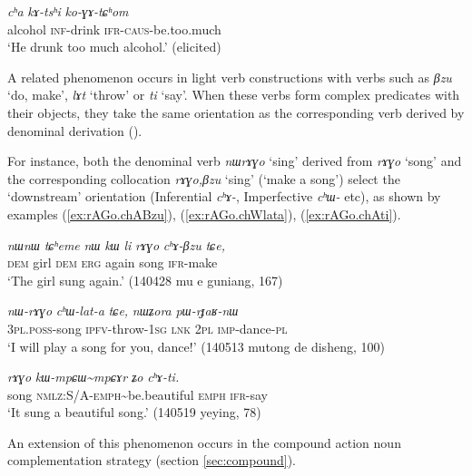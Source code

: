 \documentclass[oneside,a4paper,11pt]{article}
\newcommand{\ipa}[1]{\textit{\phon#1}}
\newcommand{\jpg}[2]{\ipa{#1} `#2'}
\newcommand{\tld}{\textasciitilde{}}
\newcommand{\refb}[1]{(\ref{#1})}
\begin{document}
\begin{exe}
\ex 
\gll \ipa{cʰa} 	\ipa{kɤ-tsʰi} 	\ipa{ko-ɣɤ-tɕʰom} \\
alcohol \textsc{inf}-drink \textsc{ifr-caus}-be.too.much \\
\glt `He drunk too much alcohol.' (elicited)
\end{exe}

A related phenomenon occurs in light verb constructions with verbs such as \jpg{βzu}{do, make}, \jpg{lɤt}{throw} or \jpg{ti}{say}. When these verbs form complex predicates with their objects, they take the same orientation as the corresponding verb derived by denominal derivation (\citealt[1220]{jacques12incorp}). 

For instance, both the denominal verb \jpg{nɯrɤɣo}{sing} derived from \jpg{rɤɣo}{song} and the corresponding collocation \jpg{rɤɣo,βzu}{sing} (`make a song') select the `downstream' orientation (Inferential \ipa{cʰɤ-}, Imperfective \ipa{cʰɯ-} etc), as shown by examples \refb{ex:rAGo.chABzu}, \refb{ex:rAGo.chWlata}, \refb{ex:rAGo.chAti}.

\begin{exe}
\ex \label{ex:rAGo.chABzu}
\gll \ipa{nɯnɯ} 	\ipa{tɕʰeme} 	\ipa{nɯ} 	\ipa{kɯ} 	\ipa{li} 	\ipa{rɤɣo} 	\ipa{cʰɤ-βzu} 	\ipa{tɕe,} \\
\textsc{dem} girl \textsc{dem} \textsc{erg} again song \textsc{ifr}-make \\
\glt `The girl sung again.' (140428 mu e guniang, 167)
\end{exe}

\begin{exe}
\ex \label{ex:rAGo.chWlata}
\gll 
\ipa{nɯ-rɤɣo} 	\ipa{cʰɯ-lat-a} 	\ipa{tɕe,} 	\ipa{nɯʑora} 	\ipa{pɯ-rɟaʁ-nɯ} \\
\textsc{3pl.poss}-song \textsc{ipfv}-throw-\textsc{1sg} \textsc{lnk} \textsc{2pl} \textsc{imp}-dance-\textsc{pl} \\
\glt `I will play a song for you, dance!' (140513 mutong de disheng, 100)
\end{exe}

\begin{exe}
\ex \label{ex:rAGo.chAti}
\gll 
\ipa{rɤɣo} 	\ipa{kɯ-mpɕɯ\tld{}mpɕɤr} 	\ipa{ʑo} 	\ipa{cʰɤ-ti.} \\
song \textsc{nmlz:S/A-emph}\tld{}be.beautiful \textsc{emph} \textsc{ifr}-say \\
\glt `It sung a beautiful song.' (140519 yeying, 78)
\end{exe}

An extension of this phenomenon occurs in the compound action noun complementation strategy (section \ref{sec:compound}).
\end{document}
